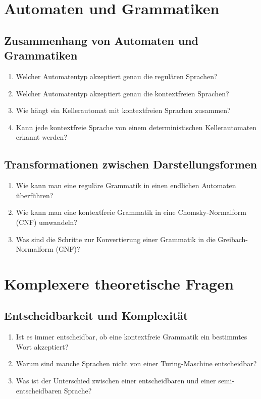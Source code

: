 \documentclass[a4paper,12pt]{article}
\begin{document}
	\section*{Automaten und Grammatiken}
	
	\subsection*{Zusammenhang von Automaten und Grammatiken}
	\begin{enumerate}
		\item Welcher Automatentyp akzeptiert genau die regulären Sprachen?
		\item Welcher Automatentyp akzeptiert genau die kontextfreien Sprachen?
		\item Wie hängt ein Kellerautomat mit kontextfreien Sprachen zusammen?
		\item Kann jede kontextfreie Sprache von einem deterministischen Kellerautomaten erkannt werden?
	\end{enumerate}
	
	\subsection*{Transformationen zwischen Darstellungsformen}
	\begin{enumerate}
		\item Wie kann man eine reguläre Grammatik in einen endlichen Automaten überführen?
		\item Wie kann man eine kontextfreie Grammatik in eine Chomsky-Normalform (CNF) umwandeln?
		\item Was sind die Schritte zur Konvertierung einer Grammatik in die Greibach-Normalform (GNF)?
	\end{enumerate}
	
	\section*{Komplexere theoretische Fragen}
	
	\subsection*{Entscheidbarkeit und Komplexität}
	\begin{enumerate}
		\item Ist es immer entscheidbar, ob eine kontextfreie Grammatik ein bestimmtes Wort akzeptiert?
		\item Warum sind manche Sprachen nicht von einer Turing-Maschine entscheidbar?
		\item Was ist der Unterschied zwischen einer entscheidbaren und einer semi-entscheidbaren Sprache?
	\end{enumerate}
	
\end{document}
